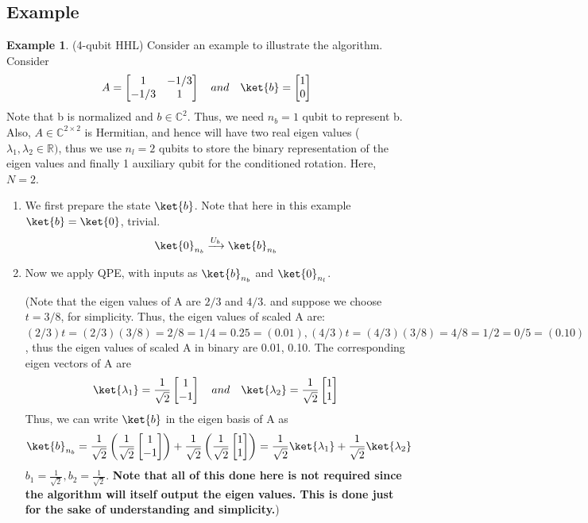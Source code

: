 \documentclass[12pt, oneside]{book}
\theoremstyle{definition}
\theoremstyle{definition}
\newtheorem{example}{Example}[section]
\theoremstyle{remark}
\begin{document}
\subsection{Example}
\begin{example}
    (4-qubit HHL) Consider an example to illustrate the algorithm. Consider
    \[
    A=\begin{bmatrix} 1 & -1/3 \\ -1/3 & 1 \end{bmatrix} \quad and \quad \ket{b}=\begin{bmatrix} 1 \\0 \end{bmatrix}
    \]
    Note that b is normalized and $b \in \mathbb{C}^2$. Thus, we need $n_b=1$ qubit to represent b. Also, $A \in \mathbb{C}^{2\times 2}$ is Hermitian, and hence will have two real eigen values ($\lambda_1,\lambda_2 \in \mathbb{R})$, thus we use $n_l=2$ qubits to store the binary representation of the eigen values and finally 1 auxiliary qubit for the conditioned rotation. Here, $N=2$.
    \begin{enumerate}
    \item We first prepare the state $\ket{b}$. Note that here in this example $\ket{b}=\ket{0}$, trivial.
    \[
    \ket{0}_{n_b} \xrightarrow{U_b} \ket{b}_{n_b}
    \]
    \item Now we apply QPE, with inputs as $\ket{b}_{n_b}$ and $\ket{0}_{n_l}$.
    
    (Note that the eigen values of A are $2/3$ and $4/3$. and suppose we choose $t=3/8$, for simplicity. Thus, the eigen values of scaled A are: $(2/3)t = (2/3)(3/8) = 2/8=1/4=0.25=(0.01), (4/3)t=(4/3)(3/8)=4/8=1/2=0/5=(0.10)$, thus the eigen values of scaled A in binary are 0.01, 0.10. The corresponding eigen vectors of A are
    \[
    \ket{\lambda_1}=\frac{1}{\sqrt{2}}\begin{bmatrix} 1 \\ -1 \end{bmatrix} \quad and \quad \ket{\lambda_2}=\frac{1}{\sqrt{2}}\begin{bmatrix} 1 \\ 1 \end{bmatrix}
    \]
    Thus, we can write $\ket{b}$ in the eigen basis of A as
    \[
    \ket{b}_{n_b}=\frac{1}{\sqrt{2}}\left(\frac{1}{\sqrt{2}}\begin{bmatrix} 1 \\ -1 \end{bmatrix} \right) + \frac{1}{\sqrt{2}}\left(\frac{1}{\sqrt{2}}\begin{bmatrix} 1 \\ 1 \end{bmatrix} \right)=\frac{1}{\sqrt{2}}\ket{\lambda_1}+\frac{1}{\sqrt{2}}\ket{\lambda_2}
    \]
    $b_1=\frac{1}{\sqrt{2}},b_2=\frac{1}{\sqrt{2}}$.
    \textbf{Note that all of this done here is not required since the algorithm will itself output the eigen values. This is done just for the sake of understanding and simplicity.})


\end{enumerate}
\end{example}
\end{document}
